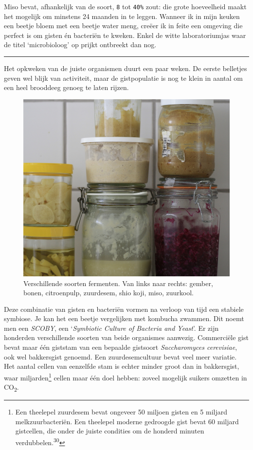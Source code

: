 \documentclass[
  11pt,
  dutch,
]{memoir}
\begin{document}
Miso bevat, afhankelijk van de soort, \texttt{8} tot \texttt{40\%} zout:
die grote hoeveelheid maakt het mogelijk om minstens 24 maanden in te
leggen. Wanneer ik in mijn keuken een beetje bloem met een beetje water
meng, creëer ik in feite een omgeving die perfect is om gisten én
bacteriën te kweken. Enkel de witte laboratoriumjas waar de titel
`microbioloog' op prijkt ontbreekt dan nog.

\pfbreak

Het opkweken van de juiste organismen duurt een paar weken. De eerste
belletjes geven wel blijk van activiteit, maar de gistpopulatie is nog
te klein in aantal om een heel brooddeeg genoeg te laten rijzen.

\begin{figure}
    \centering
    \includegraphics{img/bw/ferments.jpg}
    \caption[Verschillende soorten fermenten.]{Verschillende soorten fermenten. Van links naar rechts: gember, bonen, citroenpulp, zuurdesem, shio koji, miso, zuurkool.}
\end{figure}

Deze combinatie van gisten en bacteriën vormen na verloop van tijd een
stabiele symbiose. Je kan het een beetje vergelijken met kombucha
zwammen. Dit noemt men een \emph{SCOBY}, een `\emph{Symbiotic Culture of
Bacteria and Yeast}'. Er zijn honderden verschillende soorten van beide
organismes aanwezig. Commerciële gist bevat maar één giststam van een
bepaalde gistsoort \emph{Saccharomyces cerevisiae}, ook wel bakkersgist
genoemd. Een zuurdesemcultuur bevat veel meer variatie. Het aantal
cellen van eenzelfde stam is echter minder groot dan in bakkersgist,
waar miljarden\footnote{Een theelepel zuurdesem bevat ongeveer 50
  miljoen gisten en 5 miljard melkzuurbacteriën. Een theelepel moderne
  gedroogde gist bevat 60 miljard gistcellen, die onder de juiste
  condities om de honderd minuten verdubbelen.\textsuperscript{30}}
cellen maar één doel hebben: zoveel mogelijk suikers omzetten in
CO\textsubscript{2}.
\end{document}
